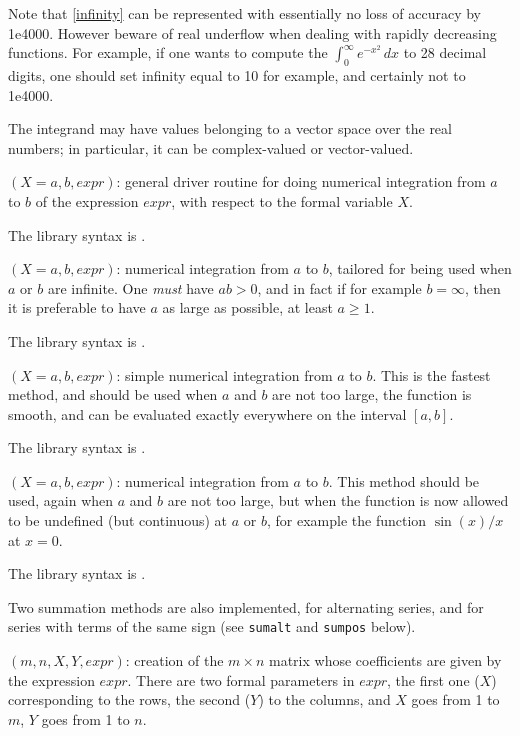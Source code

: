 Note that \ref{infinity} can be represented with essentially no loss of 
accuracy by 1e4000. However beware of real underflow when dealing with rapidly
decreasing functions. For example, if one wants to compute the
$\int_0^\infty e^{-x^2}\,dx$ to 28 decimal digits, one should set infinity
equal to 10 for example, and certainly not to 1e4000.

The integrand may have values belonging to a vector space over the real
numbers; in particular, it can be complex-valued or vector-valued.

$(X=a, b, expr)$: general driver routine for doing 
numerical integration from $a$ to $b$ of the expression $expr$, with respect to
the formal variable $X$.

The library syntax is .

$(X=a, b, expr)$: numerical integration from $a$ to $b$,
tailored for being used when $a$ or $b$ are infinite. One {\sl must} have 
$ab>0$, and in fact if for example $b=\infty$, then it is preferable to have 
$a$ as large as possible, at least $a\ge1$.

The library syntax is .

$(X=a,b,expr)$: simple numerical integration from $a$ to $b$.
This is the fastest method, and should be used when $a$ and $b$ are not too
large, the function is smooth, and can be evaluated exactly everywhere on the
interval $[a,b]$.

The library syntax is .

$(X=a,b,expr)$: numerical integration from $a$ to $b$. This
method should be used, again when $a$ and $b$ are not too large, but when the 
function is now allowed to be undefined (but continuous) at $a$ or $b$, for
example the function $\sin(x)/x$ at $x=0$.

The library syntax is .

Two summation methods are also implemented, for alternating series, and for
series with terms of the same sign (see {\tt sumalt} and {\tt sumpos} below).

$(m,n,X,Y,expr)$: creation of the $m\times n$ matrix
whose coefficients are given by the expression $expr$. There are two formal
parameters in $expr$, the first one ($X$) corresponding to the rows, the
second ($Y$) to the columns, and $X$ goes from 1 to $m$, $Y$ goes from 1 to
$n$.

